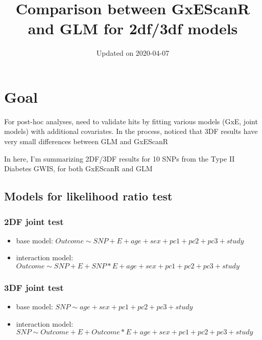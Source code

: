 \documentclass[]{article}
\title{Comparison between GxEScanR and GLM for 2df/3df models}
\date{Updated on 2020-04-07}
\providecommand{\tightlist}{%
  \setlength{\itemsep}{0pt}\setlength{\parskip}{0pt}}
\begin{document}
\maketitle

\hypertarget{goal}{%
\section{Goal}\label{goal}}

For post-hoc analyses, need to validate hits by fitting various models
(GxE, joint models) with additional covariates. In the process, noticed
that 3DF results have very small differences between GLM and GxEScanR

In here, I'm summarizing 2DF/3DF results for 10 SNPs from the Type II
Diabetes GWIS, for both GxEScanR and GLM

\hypertarget{models-for-likelihood-ratio-test}{%
\subsection{Models for likelihood ratio
test}\label{models-for-likelihood-ratio-test}}

\hypertarget{df-joint-test}{%
\subsubsection{2DF joint test}\label{df-joint-test}}

\begin{itemize}
\tightlist
\item
  base model:
  \(Outcome \sim SNP + E + age + sex + pc1 + pc2 + pc3 + study\)
\item
  interaction model:
  \(Outcome \sim SNP + E + SNP*E + age + sex + pc1 + pc2 + pc3 + study\)
\end{itemize}

\hypertarget{df-joint-test-1}{%
\subsubsection{3DF joint test}\label{df-joint-test-1}}

\begin{itemize}
\tightlist
\item
  base model: \(SNP \sim age + sex + pc1 + pc2 + pc3 + study\)
\item
  interaction model:
  \(SNP \sim Outcome + E + Outcome*E + age + sex + pc1 + pc2 + pc3 + study\)
\end{itemize}
\end{document}
